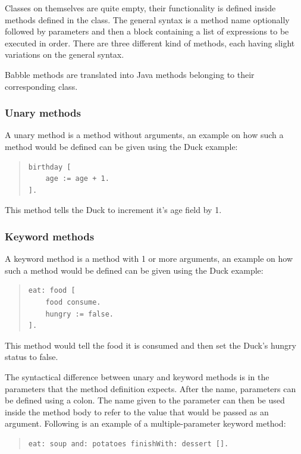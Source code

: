 \documentclass[a4paper]{article}
\begin{document}
Classes on themselves are quite empty, their functionality is defined inside methods defined in the class. The general syntax is a method name optionally followed by parameters and then a block containing a list of expressions to be executed in order.
There are three different kind of methods, each having slight variations on the general syntax.

Babble methods are translated into Java methods belonging to their corresponding class.


\subsubsection{Unary methods}

A unary method is a method without arguments, an example on how such a method would be defined can be given using the Duck example:

\begin{quote}
\begin{lstlisting}
birthday [
	age := age + 1.
].
\end{lstlisting}
\end{quote}
This method tells the Duck to increment it's age field by 1.

\subsubsection{Keyword methods}
A keyword method is a method with 1 or more arguments, an example on how such a method would be defined can be given using the Duck example:

\begin{quote}
\begin{lstlisting}
eat: food [
	food consume.
	hungry := false.
].
\end{lstlisting}
\end{quote}
This method would tell the food it is consumed and then set the Duck's hungry status to false.

The syntactical difference between unary and keyword methods is in the parameters that the method definition expects. After the name, parameters can be defined using a colon. The name given to the parameter can then be used inside the method body to refer to the value that would be passed as an argument. Following is an example of a multiple-parameter keyword method:

\begin{quote}
\begin{lstlisting}
eat: soup and: potatoes finishWith: dessert [].
\end{lstlisting}
\end{quote}
\end{document}
